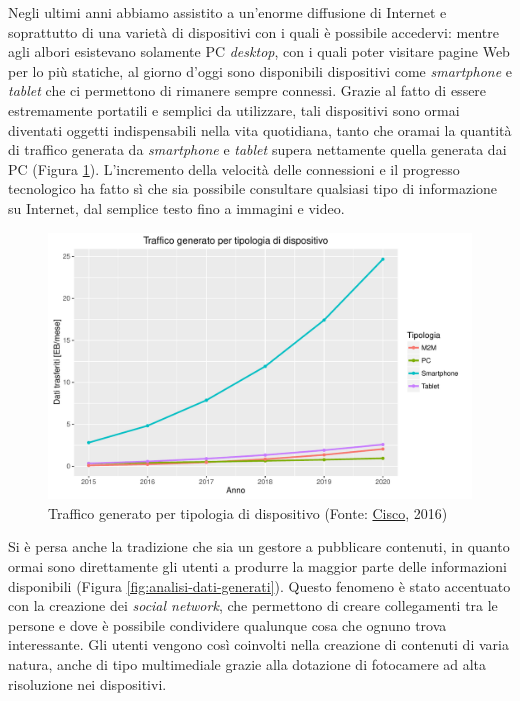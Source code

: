 Negli ultimi anni abbiamo assistito a un'enorme diffusione di Internet e soprattutto di una varietà di dispositivi con i quali è possibile accedervi: mentre agli albori esistevano solamente PC \emph{desktop}, con i quali poter visitare pagine Web per lo più statiche, al giorno d'oggi sono disponibili dispositivi come \emph{smartphone} e \emph{tablet} che ci permettono di rimanere sempre connessi. Grazie al fatto di essere estremamente portatili e semplici da utilizzare, tali dispositivi sono ormai diventati oggetti indispensabili nella vita quotidiana, tanto che oramai la quantità di traffico generata da \emph{smartphone} e \emph{tablet} supera nettamente quella generata dai PC (Figura \ref{fig:traffico-tipologia-dispositivo}). L'incremento della velocità delle connessioni e il progresso tecnologico ha fatto sì che sia possibile consultare qualsiasi tipo di informazione su Internet, dal semplice testo fino a immagini e video.

\begin{figure}[ht]
	\centering
	\includegraphics[width=\textwidth]{1-introduzione/Immagini/traffico-dispositivi.pdf}
	\caption[Traffico generato per tipologia di dispositivo]{Traffico generato per tipologia di dispositivo (Fonte: \href{http://www.cisco.com/c/en/us/solutions/collateral/service-provider/visual-networking-index-vni/mobile-white-paper-c11-520862.html}{Cisco}, 2016)\label{fig:traffico-tipologia-dispositivo}}
\end{figure}

Si è persa anche la tradizione che sia un gestore a pubblicare contenuti, in quanto ormai sono direttamente gli utenti a produrre la maggior parte delle informazioni disponibili (Figura \ref{fig:analisi-dati-generati}). Questo fenomeno è stato accentuato con la creazione dei \emph{social network}, che permettono di creare collegamenti tra le persone e dove è possibile condividere qualunque cosa che ognuno trova interessante. Gli utenti vengono così coinvolti nella creazione di contenuti di varia natura, anche di tipo multimediale grazie alla dotazione di fotocamere ad alta risoluzione nei dispositivi.

